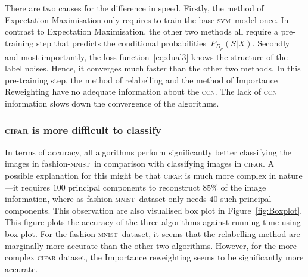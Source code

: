 \documentclass[12pt]{article} %
\newcommand{\svm}{\textsc{svm}}
\newcommand{\mnist}{fashion-\textsc{mnist}}
\begin{document}
There are two  causes for the difference in speed.
Firstly, the method of Expectation Maximisation only requires to train the base \svm\ model once.
In contrast to Expectation Maximisation, the other two methods all require a pre-training step that predicts the conditional probabilities~$P_{D_\rho}(S|X)$.
Secondly and most importantly, the loss function~\eqref{eq:dual3} knows the structure of the label noises. Hence, it converges much faster than the other two methods.
In this pre-training step, the method of relabelling and the method of Importance Reweighting have no adequate information about the \textsc{ccn}.
The lack of \textsc{ccn} information slows down the convergence of the algorithms.

\subsubsection{\textsc{cifar} is more difficult to classify}
In terms of accuracy, all algorithms perform significantly better classifying the images in \mnist\ in comparison with classifying images in \textsc{cifar}.
A possible explanation for this might be that \textsc{cifar} is much more complex in nature---it requires $100$ principal components to reconstruct $85\%$ of the image information, where as \mnist\ dataset only needs $40$ such principal components.
This observation are also visualised box plot in Figure~\ref{fig:Boxplot}. This figure plots the accuracy of the three algorithms against running time using box plot. For the \mnist\  dataset, it seems that the relabelling method are marginally more accurate than the other two algorithms. However, for the  more complex \textsc{cifar} dataset, the Importance reweighting seems to be significantly more accurate.
\end{document}
